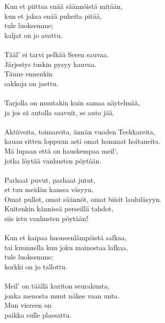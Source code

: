 
Kun et piittaa enää säännöistä mitään,\\
kun et jaksa enää puheita pitää,\\
tule luoksemme;\\
kaljat on jo avattu.\\
\hspace{10mm} \\
Tääl' ei tarvi pelkää Seren sauvaa.\\
Järjestys tuskin pysyy kauvaa.\\
Tänne ennenkin\\
sakkoja on jaettu.\\
\hspace{10mm} \\
Tarjolla on muutakin kuin samaa näytelmää,\\
ja jos sä autolla saavuit, se auto jää.\\
\hspace{10mm} \\
Aktiiveita, toimareita, ännän vuoden Teekkareita,\\
kauan sitten loppuun asti omat hommat hoitaneita.\\
Mä lupaan että on hauskempaa meil',\\
jotka löytää vanhusten pöytään.\\
\hspace{10mm} \\
Parhaat puvut, parhaat jutut,\\
et tuu meidän kanssa väsyyn.\\
Omat pullot, omat säännöt, omat biisit laululäsyyn.\\
Kuitenkin kännissä perseillä tahdot,\\
siis istu vanhusten pöytään!\\
\hspace{10mm} \\
Kun et kaipaa huoneenlämpöistä safkaa,\\
tai kuunnella kun joku mainostaa lafkaa,\\
tule luoksemme;\\
korkki on jo tallottu.\\
\hspace{10mm} \\
Meil' on täällä kuriton seurakunta,\\
jonka menosta muut näkee vaan unta.\\
Mun viereen on\\
paikka sulle plassattu.\\
